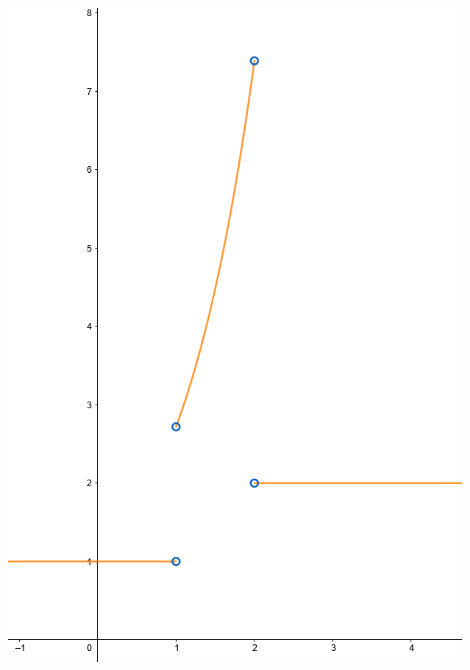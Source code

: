 \documentclass[12pt]{report}
\begin{document}
\begin{itemize}[label={}]
{{        \includegraphics[width=0.9\textwidth]{oef4_heaviside}
    }
}
\end{itemize}
\end{document}
